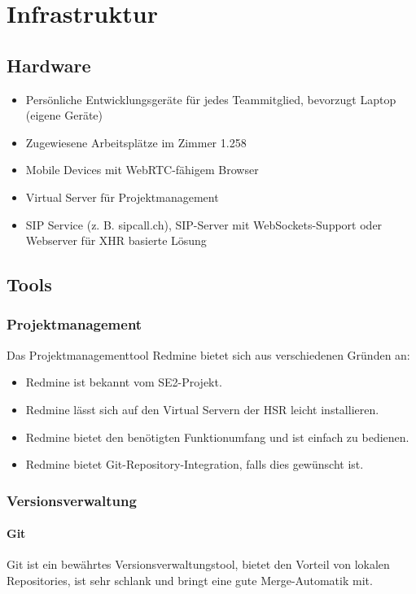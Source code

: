 \chapter{Infrastruktur}

\section{Hardware}
\begin{itemize}
	\setlength{\itemsep}{-\parsep}
	\item Persönliche Entwicklungsgeräte für jedes Teammitglied, bevorzugt Laptop (eigene Geräte)
	\item Zugewiesene Arbeitsplätze im Zimmer 1.258
	\item Mobile Devices mit WebRTC-fähigem Browser
	\item Virtual Server für Projektmanagement
	\item SIP Service (z. B. sipcall.ch), SIP-Server mit WebSockets-Support oder Webserver für XHR basierte Lösung
\end{itemize}

\section{Tools}
\subsection{Projektmanagement}
Das Projektmanagementtool Redmine bietet sich aus verschiedenen Gründen an:
\begin{itemize}
	\setlength{\itemsep}{-\parsep}
	\item Redmine ist bekannt vom SE2-Projekt.
	\item Redmine lässt sich auf den Virtual Servern der HSR leicht installieren.
	\item Redmine bietet den benötigten Funktionumfang und ist einfach zu bedienen.
	\item Redmine bietet Git-Repository-Integration, falls dies gewünscht ist.
\end{itemize}


\subsection{Versionsverwaltung}
\subsubsection{Git}
Git ist ein bewährtes Versionsverwaltungstool, bietet den Vorteil von lokalen Repositories, ist sehr schlank und bringt eine gute Merge-Automatik mit.

